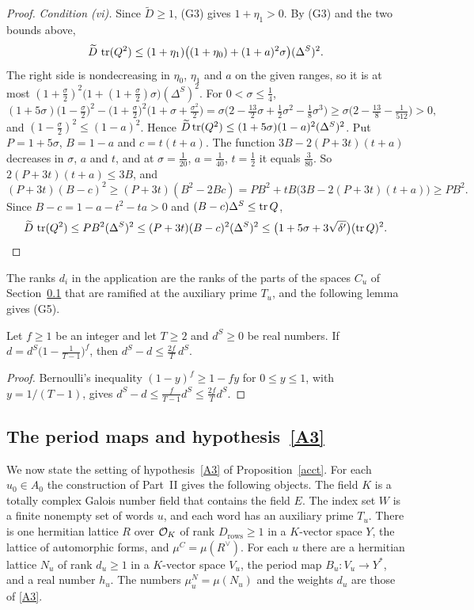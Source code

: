 \begin{proof}
\emph{Condition (vi).} Since $\widetilde D\ge1$, (G3) gives $1+\eta_1>0$. By (G3) and the two bounds above,
\[
\widetilde D\,\operatorname{tr}(Q^2)\le(1+\eta_1)\big((1+\eta_0)+(1+a)^2\sigma\big)(\Delta^S)^2 .
\]
The right side is nondecreasing in $\eta_0$, $\eta_1$ and $a$ on the given ranges, so it is at most $(1+\frac\sigma2)^2\big(1+(1+\frac\sigma2)\sigma\big)(\Delta^S)^2$. For $0<\sigma\le\frac14$,
\[
(1+5\sigma)\big(1-\tfrac\sigma2\big)^2-\big(1+\tfrac\sigma2\big)^2\big(1+\sigma+\tfrac{\sigma^2}2\big)=\sigma\Big(2-\tfrac{13}2\sigma+\tfrac12\sigma^2-\tfrac18\sigma^3\Big)\ge\sigma\Big(2-\tfrac{13}8-\tfrac1{512}\Big)>0,
\]
and $(1-\frac\sigma2)^2\le(1-a)^2$. Hence $\widetilde D\operatorname{tr}(Q^2)\le(1+5\sigma)(1-a)^2(\Delta^S)^2$. Put $P=1+5\sigma$, $B=1-a$ and $c=t(t+a)$. The function $3B-2(P+3t)(t+a)$ decreases in $\sigma$, $a$ and $t$, and at $\sigma=\frac1{20}$, $a=\frac1{40}$, $t=\frac12$ it equals $\frac3{80}$. So $2(P+3t)(t+a)\le3B$, and
\[
(P+3t)(B-c)^2\ge(P+3t)(B^2-2Bc)=PB^2+tB\big(3B-2(P+3t)(t+a)\big)\ge PB^2 .
\]
Since $B-c=1-a-t^2-ta>0$ and $(B-c)\Delta^S\le\operatorname{tr} Q$,
\[
\widetilde D\,\operatorname{tr}(Q^2)\le PB^2(\Delta^S)^2\le(P+3t)(B-c)^2(\Delta^S)^2\le\big(1+5\sigma+3\sqrt{\delta'}\big)(\operatorname{tr} Q)^2 .\qedhere
\]
\end{proof}

The ranks $d_i$ in the application are the ranks of the parts of the spaces $C_u$ of Section~\ref{r3:sec:A3} that are ramified at the auxiliary prime $T_u$, and the following lemma gives (G5).

\begin{lemma}\label{r3:ramshare}
Let $f\ge1$ be an integer and let $T\ge2$ and $d^S\ge0$ be real numbers. If $d=d^S\big(1-\frac1{T-1}\big)^f$, then $d^S-d\le\frac{2f}T\,d^S$.
\end{lemma}

\begin{proof}
Bernoulli's inequality $(1-y)^f\ge1-fy$ for $0\le y\le1$, with $y=1/(T-1)$, gives $d^S-d\le\frac f{T-1}d^S\le\frac{2f}Td^S$.
\end{proof}

\subsection{The period maps and hypothesis~\eqref{A3}}\label{r3:sec:A3}

We now state the setting of hypothesis~\eqref{A3} of Proposition~\ref{acct}. For each $u_0\in A_0$ the construction of Part~II gives the following objects. The field $K$ is a totally complex Galois number field that contains the field $E$. The index set $W$ is a finite nonempty set of words $u$, and each word has an auxiliary prime $T_u$. There is one hermitian lattice $R$ over $\mathcal O_K$ of rank $D_{\mathrm{rows}}\ge1$ in a $K$-vector space $Y$, the lattice of automorphic forms, and $\mu^C=\mu(R^\vee)$. For each $u$ there are a hermitian lattice $N_u$ of rank $d_u\ge1$ in a $K$-vector space $V_u$, the period map $B_u\colon V_u\to Y^*$, and a real number $h_u$. The numbers $\mu^N_u=\mu(N_u)$ and the weights $d_u$ are those of \eqref{A3}.

